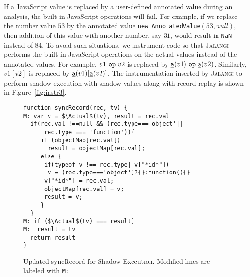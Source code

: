 \documentclass{sig-alternate}
\def\jalangi{\textsc{Jalangi}}
\newcommand \dsl [1] {\ensuremath{{\tt #1}}\xspace}
\newcommand \usl [1] {\mbox{\underline{\tt #1}}\xspace}
\newcommand \Actual{\usl{a}}
\begin{document}
If a JavaScript value is replaced by a user-defined annotated value
during an analysis, the built-in JavaScript operations will fail.  For
example, if we replace the number value $53$ by the annotated value
\texttt{new AnnotatedValue}$(53, null)$, then addition of this value
with another number, say $31$, would result in \texttt{NaN} instead of
$84$.  To avoid such situations, we instrument code so that \jalangi{}
performs the built-in JavaScript operations on the actual values
instead of the annotated values.  For example, $v1\ \dsl{op}\ v2$ is
replaced by $\Actual(v1)\ \dsl{op}\ \Actual(v2)$.  Similarly, $v1[v2]$
is replaced by $\Actual(v1)[\Actual(v2)]$.  The instrumentation
inserted by \jalangi{} to perform shadow execution with shadow values
along with record-replay is shown in Figure~\ref{fig:instr3}.

\lstset{language=JavaScript}
\begin{figure}
 {\small 
\begin{lstlisting}[mathescape]
function syncRecord(rec, tv) {
M: var v = $\Actual$(tv), result = rec.val
  if(rec.val !==null && (rec.type==='object'|| 
      rec.type === 'function')){
     if (objectMap[rec.val])
       result = objectMap[rec.val];
     else {
      if(typeof v !== rec.type||v["*id*"]) 
       v = (rec.type==='object')?{}:function(){}
      v["*id*"] = rec.val;
      objectMap[rec.val] = v;
      result = v;
     }
  }
M: if ($\Actual$(tv) === result)
M:  result = tv
  return result
}
\end{lstlisting}
}
  \caption{Updated syncRecord for Shadow Execution.  Modified lines
    are labeled with \texttt{M:}\vspace*{1ex}}
  \label{fig:lib3}

\end{figure}
\end{document}
